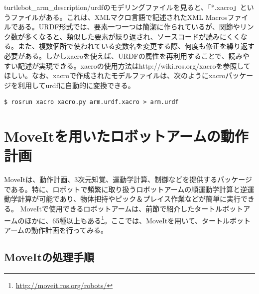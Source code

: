 \begin{exercise}[Xacroファイル]
turtlebot\_arm\_description/urdfのモデリングファイルを見ると、「*.xacro」というファイルがある。これは、XMLマクロ言語で記述されたXML Macrosファイルである。URDF形式では、要素一つ一つは簡潔に作られているが、関節やリンク数が多くなると、類似した要素が繰り返され、ソースコードが読みにくくなる。また、複数個所で使われている変数名を変更する際、何度も修正を繰り返す必要がある。しかしxacroを使えば、URDFの属性を再利用することで、読みやすい記述が実現できる。xacroの使用方法はhttp://wiki.ros.org/xacroを参照してほしい。なお、xacroで作成されたモデルファイルは、次のようにxacroパッケージを利用してurdfに自動的に変換できる。

\begin{lstlisting}[language=ROS]
$ rosrun xacro xacro.py arm.urdf.xacro > arm.urdf
\end{lstlisting}
\end{exercise}

\section{MoveItを用いたロボットアームの動作計画}

MoveItは、動作計画、3次元知覚、運動学計算、制御などを提供するパッケージである。特に、ロボットで頻繁に取り扱うロボットアームの順運動学計算と逆運動学計算が可能であり、物体把持やピック＆プレイス作業などが簡単に実行できる。
MoveItで使用できるロボットアームは、前節で紹介したタートルボットアームのほかに、65種以上もある\footnote{\url{http://moveit.ros.org/robots/}}。ここでは、MoveItを用いて、タートルボットアームの動作計画を行ってみる。

\subsection{MoveItの処理手順}

